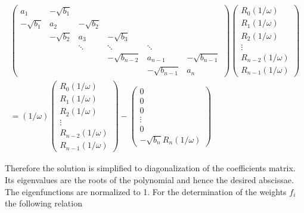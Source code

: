 \begin{equation}
 \begin{split}
 \begin{pmatrix}
a_1        & -\sqrt{b_1}&            &                &             &          \\
-\sqrt{b_1}& a_2        & -\sqrt{b_2}&                &             &          \\
           & -\sqrt{b_2}& a_3        & -\sqrt{b_3}    &             &          \\
           &            & \ddots     & \ddots         & \ddots      &          \\
           &            &            & -\sqrt{b_{n-2}}& a_{n-1}     & -\sqrt{b_{n-1}}\\
           &            &            &                & -\sqrt{b_{n-1}}& a_n   
 \end{pmatrix}
 \begin{pmatrix}
  R_0(1/\omega)\\
  R_1(1/\omega)\\
  R_2(1/\omega)\\
  \vdots\\
  R_{n-2}(1/\omega)\\
  R_{n-1}(1/\omega)
 \end{pmatrix}         \\
 = (1/\omega)
 \begin{pmatrix}
  R_0(1/\omega)\\
  R_1(1/\omega)\\
  R_2(1/\omega)\\
  \vdots\\
  R_{n-2}(1/\omega)\\
  R_{n-1}(1/\omega)
 \end{pmatrix}
 -
 \begin{pmatrix}
  0\\
  0\\
  0\\
  \vdots\\
  0\\
  -\sqrt{b_n} R_{n}(1/\omega)
 \end{pmatrix}
 \end{split}
\end{equation}

Therefore the solution is simplified to diagonalization
of the coefficients matrix. Its eigenvalues are the roots of the polynomial
and hence the desired abscissae. The eigenfunctions are normalized to 1. For the
determination of the weights $f_i$ the following relation 

